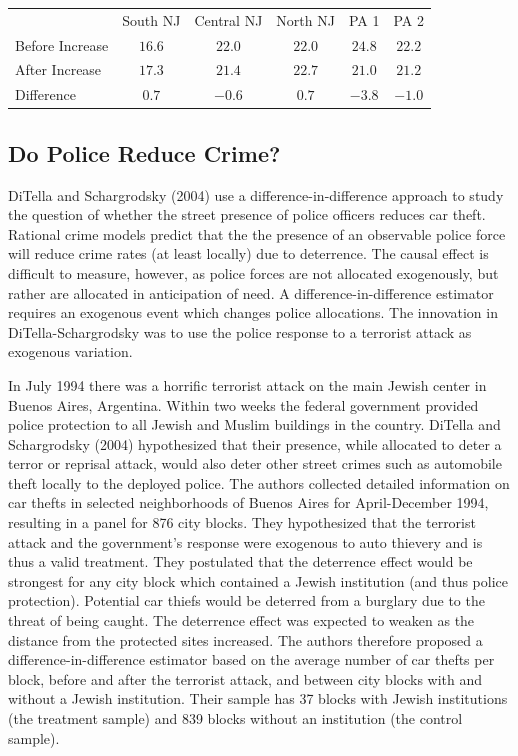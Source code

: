 \documentclass[10pt]{article}
\begin{document}
\begin{tabular}{lccccc}
\hline\hline
 & South NJ & Central NJ & North NJ & PA 1 & PA 2 \\
\cline { 2 - 6 }
Before Increase & $16.6$ & $22.0$ & $22.0$ & $24.8$ & $22.2$ \\
After Increase & $17.3$ & $21.4$ & $22.7$ & $21.0$ & $21.2$ \\
Difference & $0.7$ & $-0.6$ & $0.7$ & $-3.8$ & $-1.0$ \\
\hline
\end{tabular}

\subsection{Do Police Reduce Crime?}
DiTella and Schargrodsky (2004) use a difference-in-difference approach to study the question of whether the street presence of police officers reduces car theft. Rational crime models predict that the the presence of an observable police force will reduce crime rates (at least locally) due to deterrence. The causal effect is difficult to measure, however, as police forces are not allocated exogenously, but rather are allocated in anticipation of need. A difference-in-difference estimator requires an exogenous event which changes police allocations. The innovation in DiTella-Schargrodsky was to use the police response to a terrorist attack as exogenous variation.

In July 1994 there was a horrific terrorist attack on the main Jewish center in Buenos Aires, Argentina. Within two weeks the federal government provided police protection to all Jewish and Muslim buildings in the country. DiTella and Schargrodsky (2004) hypothesized that their presence, while allocated to deter a terror or reprisal attack, would also deter other street crimes such as automobile theft locally to the deployed police. The authors collected detailed information on car thefts in selected neighborhoods of Buenos Aires for April-December 1994, resulting in a panel for 876 city blocks. They hypothesized that the terrorist attack and the government's response were exogenous to auto thievery and is thus a valid treatment. They postulated that the deterrence effect would be strongest for any city block which contained a Jewish institution (and thus police protection). Potential car thiefs would be deterred from a burglary due to the threat of being caught. The deterrence effect was expected to weaken as the distance from the protected sites increased. The authors therefore proposed a difference-in-difference estimator based on the average number of car thefts per block, before and after the terrorist attack, and between city blocks with and without a Jewish institution. Their sample has 37 blocks with Jewish institutions (the treatment sample) and 839 blocks without an institution (the control sample).
\end{document}
